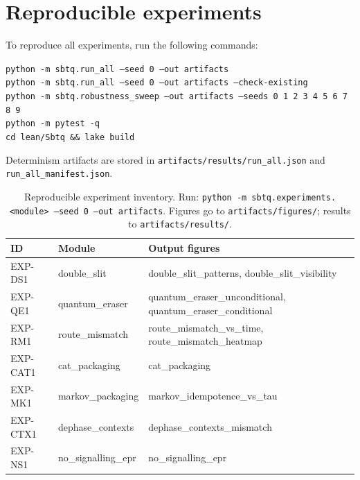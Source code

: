 \section{Reproducible experiments}\label{app:repro}

To reproduce all experiments, run the following commands:

\noindent\texttt{python -m sbtq.run\_all --seed 0 --out artifacts} \\
\texttt{python -m sbtq.run\_all --seed 0 --out artifacts --check-existing} \\
\texttt{python -m sbtq.robustness\_sweep --out artifacts --seeds 0 1 2 3 4 5 6 7 8 9} \\
\texttt{python -m pytest -q} \\
\texttt{cd lean/Sbtq \&\& lake build}

\medskip
\noindent Determinism artifacts are stored in \texttt{artifacts/results/run\_all.json} and \texttt{run\_all\_manifest.json}.

\begin{table}[t]
  \centering
  \scriptsize
  \setlength{\tabcolsep}{4pt}
  \begin{tabular}{@{}lll@{}}
    \toprule
    ID & Module & Output figures \\
    \midrule
    EXP-DS1 & double\_slit & double\_slit\_patterns, double\_slit\_visibility \\
    EXP-QE1 & quantum\_eraser & quantum\_eraser\_unconditional, quantum\_eraser\_conditional \\
    EXP-RM1 & route\_mismatch & route\_mismatch\_vs\_time, route\_mismatch\_heatmap \\
    EXP-CAT1 & cat\_packaging & cat\_packaging \\
    EXP-MK1 & markov\_packaging & markov\_idempotence\_vs\_tau \\
    EXP-CTX1 & dephase\_contexts & dephase\_contexts\_mismatch \\
    EXP-NS1 & no\_signalling\_epr & no\_signalling\_epr \\
    \bottomrule
  \end{tabular}
  \caption{Reproducible experiment inventory. Run: \texttt{python -m sbtq.experiments.<module> --seed 0 --out artifacts}. Figures go to \texttt{artifacts/figures/}; results to \texttt{artifacts/results/}.}
  \label{tab:experiment-inventory}
\end{table}
